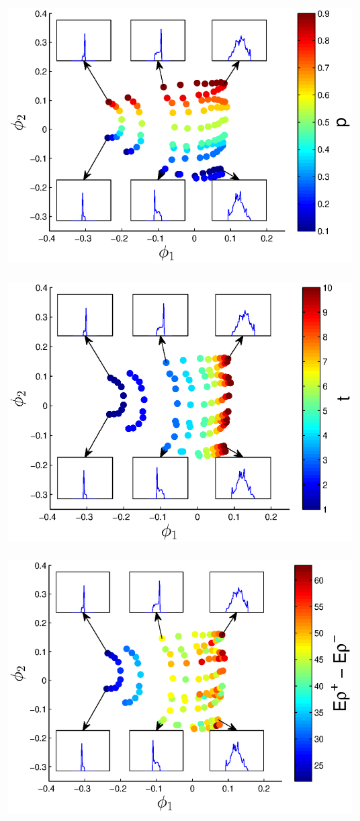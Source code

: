 \begin{figure}[t!]
\begin{subfigure}{\figwidth}
\includegraphics[width=\textwidth]{EMD_withhist_p_400}
\caption{}
\label{subfig:large_lambda_p}
\end{subfigure}
\begin{subfigure}{\figwidth}
\includegraphics[width=\textwidth]{EMD_withhist_t_400}
\caption{}
\label{subfig:large_lambda_t}
\end{subfigure}
\begin{subfigure}{\figwidth}
\includegraphics[width=\textwidth]{EMD_withhist_rho_400}

\end{subfigure}
\end{figure}
